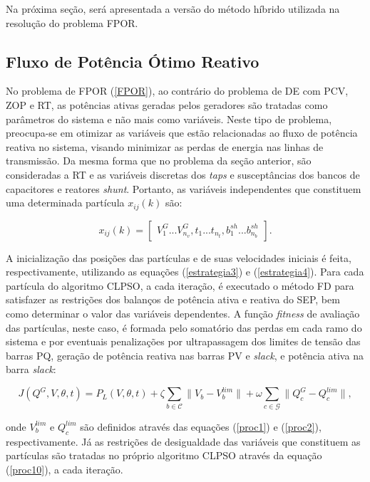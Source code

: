 \documentclass[
	12pt,				%
	openany,			%
	twoside,			%
	a4paper,			%
	chapter=TITLE,		%
	section=Title,		%
	subsection=Title,	%
	subsubsection=Title,%
	english,			%
	french,				%
	spanish,			%
	brazil			%
	]{abntex2}
\begin{document}
\begin{ERRATA}
\begin{algorithm}[hbt!]
\end{algorithm}
Na próxima seção, será apresentada a versão do método híbrido utilizada na resolução do problema FPOR.
\pagebreak
\subsection{Fluxo de Potência Ótimo Reativo}

No problema de FPOR (\ref{FPOR}), ao contrário do problema de DE com PCV, ZOP e RT, as potências ativas geradas pelos geradores são tratadas como parâmetros do sistema e não mais como variáveis. Neste tipo de problema, preocupa-se em otimizar as variáveis que estão relacionadas ao fluxo de potência reativa no sistema, visando minimizar as perdas de energia nas linhas de transmissão. Da mesma forma que no problema da seção anterior, são consideradas a RT e as variáveis discretas dos \emph{taps} e susceptâncias dos bancos de capacitores e reatores \emph{shunt}. Portanto, as variáveis independentes que constituem uma determinada partícula $x_{ij}(k)$ são:

\begin{equation}\label{partfpor}
x_{ij}(k) = \begin{bmatrix}
V^G_1 . . . V^G_{n_v}, t_1 . . . t_{n_t}, b^{sh}_1 . . . b^{sh}_{n_b}
\end{bmatrix}.
\end{equation}

A inicialização das posições das partículas e de suas velocidades iniciais é feita, respectivamente, utilizando as equações (\ref{estrategia3}) e (\ref{estrategia4}). Para cada partícula do algoritmo CLPSO, a cada iteração, é executado o método FD para satisfazer as restrições dos balanços de potência ativa e reativa do SEP, bem como determinar o valor das variáveis dependentes. A função \emph{fitness} de avaliação das partículas, neste caso, é formada pelo somatório das perdas em cada ramo do sistema e por eventuais penalizações por ultrapassagem dos limites de tensão das barras PQ, geração de potência reativa nas barras PV e \emph{slack}, e potência ativa na barra \emph{slack}:

\begin{equation}\label{fit3}
J(Q^G, V, \theta, t) = P_L(V, \theta, t) + \zeta \sum_{b \in \mathcal{C}}{\lVert V_b - V^{lim}_b \rVert} + \omega \sum_{c \in \mathcal{G}}{\lVert Q^G_c - Q^{lim}_c \rVert},
\end{equation}

\noindent onde $V^{lim}_b$ e $Q^{lim}_c$ são definidos através das equações (\ref{proc1}) e (\ref{proc2}), respectivamente. Já as restrições de desigualdade das variáveis que constituem as partículas são tratadas no próprio algoritmo CLPSO através da equação (\ref{proc10}), a cada iteração.


\end{ERRATA}
\end{document}
